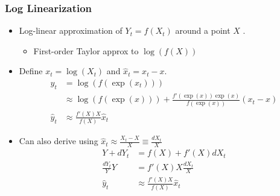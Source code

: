 \documentclass[english,xcolor=svgnames]{beamer}
\begin{document}

\begin{frame}
\frametitle{Log Linearization}
\begin{itemize}
	\item Log-linear approximation of $Y_t = f (X_t )$ around a point $X$ .
	\begin{itemize}
		\item First-order Taylor approx to $\log (f(X))$
	\end{itemize}
	\item Define $x_t=\log(X_t)$ and $\hat{x}_t = x_t-x$.
	\begin{align*}
		y_t &= \log (f(\exp(x_t))) \\
		 &\approx \log (f(\exp(x))) +  \frac{f'(\exp(x))\exp(x)}{f(\exp(x))}(x_t-x) \\
		 \hat{y}_t &\approx \frac{f'(X)X}{f(X)}\hat{x}_t
	\end{align*}
	\item Can also derive using $\hat{x}_t\approx\frac{X_t-X}{X}\equiv\frac{dX_t}{X}$
	\begin{align*}
		Y + dY_t &= f(X)+f'(X)dX_t \\
		\frac{dY_t}{Y}Y &= f'(X)X\frac{dX_t}{X} \\
		\hat{y}_t &\approx \frac{f'(X)X}{f(X)}\hat{x}_t
	\end{align*}
\end{itemize}
\end{frame}
\end{document}
